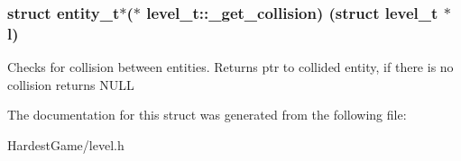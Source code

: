 \subsubsection[{\texorpdfstring{\+\_\+get\+\_\+collision}{_get_collision}}]{\setlength{\rightskip}{0pt plus 5cm}struct {\bf entity\+\_\+t}$\ast$($\ast$ level\+\_\+t\+::\+\_\+get\+\_\+collision) (struct {\bf level\+\_\+t} $\ast$l)}\hypertarget{structlevel__t_aaffeed5326370cd0b642502aeb23d6e3}{}\label{structlevel__t_aaffeed5326370cd0b642502aeb23d6e3}
Checks for collision between entities. Returns ptr to collided entity, if there is no collision returns N\+U\+LL 

The documentation for this struct was generated from the following file\+:\begin{DoxyCompactItemize}
\item 
Hardest\+Game/level.\+h\end{DoxyCompactItemize}
